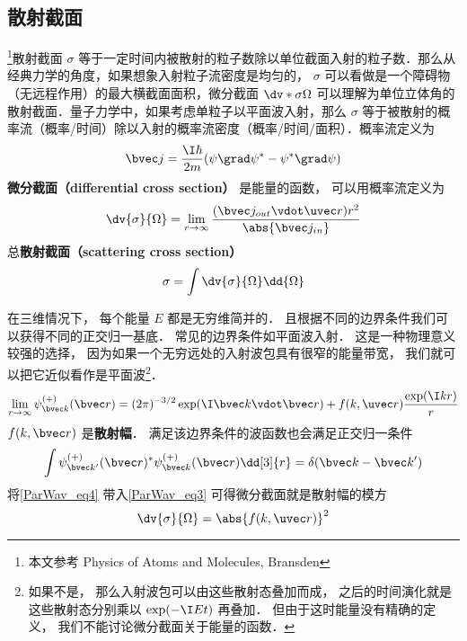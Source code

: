 

\subsection{散射截面}

\footnote{本文参考 Physics of Atoms and Molecules, Bransden}散射截面 $\sigma$ 等于一定时间内被散射的粒子数除以单位截面入射的粒子数．那么从经典力学的角度，如果想象入射粒子流密度是均匀的， $\sigma$ 可以看做是一个障碍物（无远程作用）的最大横截面面积，微分截面 $\dv*{\sigma}{\Omega}$ 可以理解为单位立体角的散射截面．量子力学中，如果考虑单粒子以平面波入射，那么 $\sigma$ 等于被散射的概率流（概率/时间）除以入射的概率流密度（概率/时间/面积）．概率流定义为
\begin{equation}
\bvec j = \frac{\I\hbar }{2m}(\psi \grad \psi^* - \psi^* \grad \psi )
\end{equation}
\textbf{微分截面（differential cross section）} 是能量的函数， 可以用概率流定义为
\begin{equation}\label{ParWav_eq3}
\dv{\sigma}{\Omega} = \lim_{r\to\infty} \frac{(\bvec j_{out} \vdot \uvec r) r^2}{\abs{\bvec j_{in}}}
\end{equation}
总\textbf{散射截面（scattering cross section）}
\begin{equation}
\sigma = \int \dv{\sigma}{\Omega} \dd{\Omega} 
\end{equation}

在三维情况下， 每个能量 $E$ 都是无穷维简并的． 且根据不同的边界条件我们可以获得不同的正交归一基底． 常见的边界条件如平面波入射． 这是一种物理意义较强的选择， 因为如果一个无穷远处的入射波包具有很窄的能量带宽， 我们就可以把它近似看作是平面波\footnote{如果不是， 那么入射波包可以由这些散射态叠加而成， 之后的时间演化就是这些散射态分别乘以 $\exp(-\I E t)$ 再叠加． 但由于这时能量没有精确的定义， 我们不能讨论微分截面关于能量的函数．}．
\begin{equation}
\lim_{r \to \infty} \psi_{\bvec k}^{(+)}(\bvec r) = (2\pi)^{-3/2} \exp(\I \bvec k \vdot \bvec r) + f(k, \uvec r) \frac{\exp(\I k r)}{r}
\end{equation}
$f(k, \bvec r)$ 是\textbf{散射幅}． 满足该边界条件的波函数也会满足正交归一条件
\begin{equation}
\int \psi_{\bvec k'}^{(+)}(\bvec r)^* \psi_{\bvec k}^{(+)}(\bvec r) \dd[3]{r} = \delta(\bvec k - \bvec k')
\end{equation}
将\autoref{ParWav_eq4} 带入\autoref{ParWav_eq3} 可得微分截面就是散射幅的模方
\begin{equation}
\dv{\sigma}{\Omega} = \abs{f(k, \uvec r)}^2
\end{equation}

